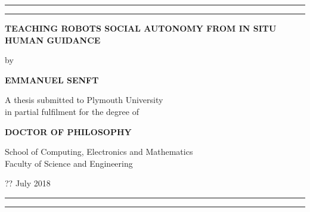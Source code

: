 {\centering
\rule{\textwidth}{1pt}\par %
\vspace{2pt}\vspace{-\baselineskip} %
\rule{\textwidth}{0.4pt}\par %

\vspace*{4\baselineskip}
\centering
\textbf{TEACHING ROBOTS SOCIAL AUTONOMY FROM IN SITU HUMAN GUIDANCE}
\vspace*{2\baselineskip}

by
\vspace*{2\baselineskip}

\textbf{EMMANUEL SENFT}
\vspace*{6\baselineskip}

A thesis submitted to Plymouth University\\
in partial fulfilment for the degree of
\vspace*{2\baselineskip}

\textbf{DOCTOR OF PHILOSOPHY}
\vfill

School of Computing, Electronics and Mathematics\\
Faculty of Science and Engineering
\vspace*{2\baselineskip}

?? July 2018

\rule{\textwidth}{0.4pt}\par %
\vspace{2pt}\vspace{-\baselineskip} %
\rule{\textwidth}{1pt}\par} %
